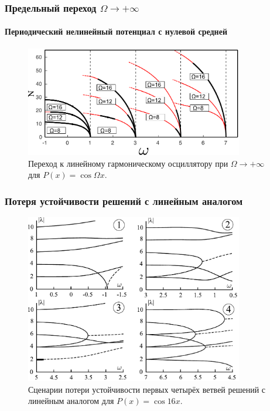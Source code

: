 \documentclass{beamer}
\begin{document}
\begin{frame}
	\frametitle{Предельный переход $\Omega \to +\infty$}
	\framesubtitle{Периодический нелинейный потенциал с нулевой средней}
	
	\begin{figure}
		\includegraphics[width=0.85\textwidth]{pic/linear_oscillator_limit.pdf}
		\caption{Переход к линейному гармоническому осциллятору при $\Omega \to +\infty$ для $P(x) = \cos \Omega x$.}
		\label{pic:linear_limit}
	\end{figure}
\end{frame}

\begin{frame}
	\frametitle{Потеря устойчивости решений с линейным аналогом}
	
	\begin{figure}
		\includegraphics[width=0.85\textwidth]{pic/stability_loss.pdf}
		\caption{Сценарии потери устойчивости первых четырёх ветвей  решений с линейным аналогом для $P(x) = \cos 16 x$.}
		\label{pic:stability_loss}
	\end{figure}
\end{frame}
\end{document}
